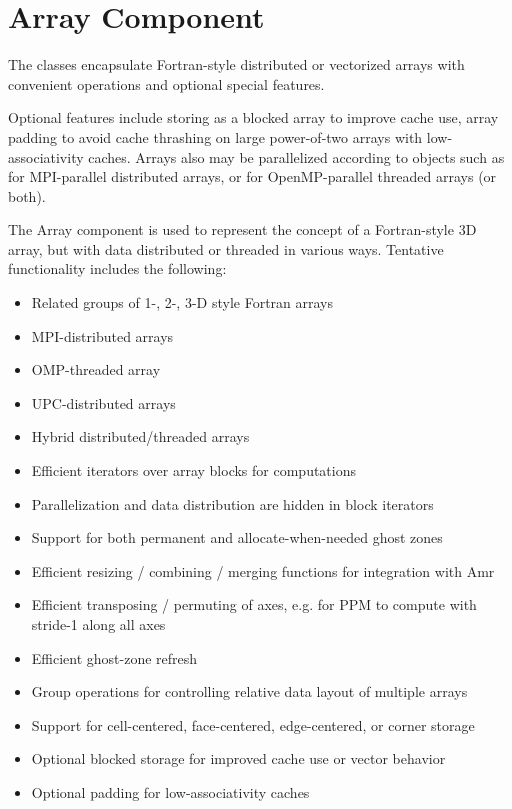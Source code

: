 \section{Array Component} \label{s:component-array}

The  classes encapsulate Fortran-style distributed or
vectorized arrays with convenient operations and optional special
features.

Optional features include storing as a blocked array to improve cache
use, array padding to avoid cache thrashing on large power-of-two
arrays with low-associativity caches.  Arrays also may be parallelized
according to  objects such as
 for MPI-parallel distributed arrays, or
 for OpenMP-parallel threaded arrays (or both).

The Array component is used to represent the concept of a
Fortran-style 3D array, but with data distributed or threaded in
various ways. Tentative functionality includes the following:

\begin{itemize}
\item Related groups of 1-, 2-, 3-D style Fortran arrays
\item MPI-distributed arrays
\item OMP-threaded array
\item UPC-distributed arrays
\item Hybrid distributed/threaded arrays
\item Efficient iterators over array blocks for computations
\item Parallelization and data distribution are hidden in block
  iterators
\item Support for both permanent and allocate-when-needed ghost zones
\item Efficient resizing / combining / merging functions for
  integration with Amr
\item Efficient transposing / permuting of axes, e.g. for PPM to
  compute with stride-1 along all axes
\item Efficient ghost-zone refresh
\item Group operations for controlling relative data layout of
  multiple arrays
\item Support for cell-centered, face-centered, edge-centered, or
  corner storage
\item Optional blocked storage for improved cache use or vector
  behavior
\item Optional padding for low-associativity caches
\end{itemize}

